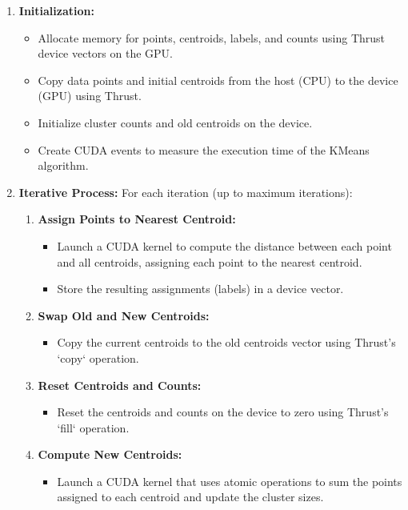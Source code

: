\documentclass[letterpaper,12pt]{article}
\theoremstyle{remark}
\begin{document}
\begin{enumerate}
    \item \textbf{Initialization:}
    \begin{itemize}
        \item Allocate memory for points, centroids, labels, and counts using Thrust device vectors on the GPU.
        \item Copy data points and initial centroids from the host (CPU) to the device (GPU) using Thrust.
        \item Initialize cluster counts and old centroids on the device.
        \item Create CUDA events to measure the execution time of the KMeans algorithm.
    \end{itemize}

    \item \textbf{Iterative Process:} For each iteration (up to maximum iterations):
    \begin{enumerate}
        \item \textbf{Assign Points to Nearest Centroid:}
        \begin{itemize}
            \item Launch a CUDA kernel to compute the distance between each point and all centroids, assigning each point to the nearest centroid.
            \item Store the resulting assignments (labels) in a device vector.
        \end{itemize}

        \item \textbf{Swap Old and New Centroids:}
        \begin{itemize}
            \item Copy the current centroids to the old centroids vector using Thrust's `copy` operation.
        \end{itemize}

        \item \textbf{Reset Centroids and Counts:}
        \begin{itemize}
            \item Reset the centroids and counts on the device to zero using Thrust's `fill` operation.
        \end{itemize}

        \item \textbf{Compute New Centroids:}
        \begin{itemize}
            \item Launch a CUDA kernel that uses atomic operations to sum the points assigned to each centroid and update the cluster sizes.
        \end{itemize}


\end{enumerate}
\end{enumerate}
\end{document}
